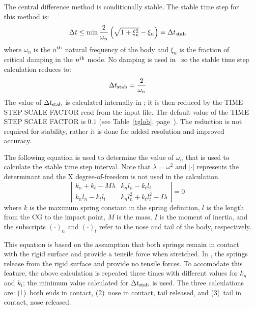 The central difference method is conditionally stable.  The stable time
step for this method is:
\begin{displaymath}
\Delta t \le\min\frac{2}{\omega_n}\left(\sqrt{1+\xi^2_n}-\xi_n\right) =
\Delta t_{\rm stab}
\end{displaymath}
where $\omega_n$ is the $n^{\rm th}$ natural frequency of the body and
$\xi_n$ is the fraction of critical damping in the $n^{\rm th}$ mode. No
damping is used in \SLAP\ so the stable time step calculation reduces
to: 
\begin{displaymath}
\Delta t_{\rm stab} = \frac{2}{\omega_n}
\end{displaymath}
The value of $\Delta t_{\rm stab}$ is calculated internally in \SLAP; it
is then reduced by the {\sf TIME STEP SCALE FACTOR} read from the input
file.  The default value of the {\sf TIME STEP SCALE FACTOR} is $0.1$
(see Table~\ref{tglob}, page~\pageref{tglob}).  The reduction is not
required for stability, rather it is done for added resolution and
improved accuracy. 

The following equation is used to determine the value of $\omega_n$ that
is used to calculate the stable time step interval.  Note that $\lambda
= \omega^2$ and $|\cdot|$ represents the determinant and the X
degree-of-freedom is not used in the calculation. 
\begin{displaymath}
\left|\begin{array}{ll} k_n + k_t - M\lambda & k_n l_n - k_t l_t \\
                         k_n l_n - k_t l_t   & k_n l_n^2 + k_t l_t^2 - I\lambda
      \end{array}\right|
= 0
\end{displaymath}
where $k$ is the maximum spring constant in the spring definition, $l$
is the length from the CG to the impact point, $M$ is the mass, $I$ is
the moment of inertia, and the subscripts $(\cdot)_n$ and $(\cdot)_t$
refer to the nose and tail of the body, respectively.

This equation is based on the assumption that both springs remain in
contact with the rigid surface and provide a tensile force when
stretched.  In \SLAP, the springs release from the rigid surface and
provide no tensile forces.  To accomodate this feature, the above
calculation is repeated three times with different values for $k_n$ and
$k_t$; the minimum value calculated for $\Delta t_{\rm stab}$ is
used.  The three calculations are: (1)~both ends in contact, (2)~nose in
contact, tail released, and (3)~tail in contact, nose released.

